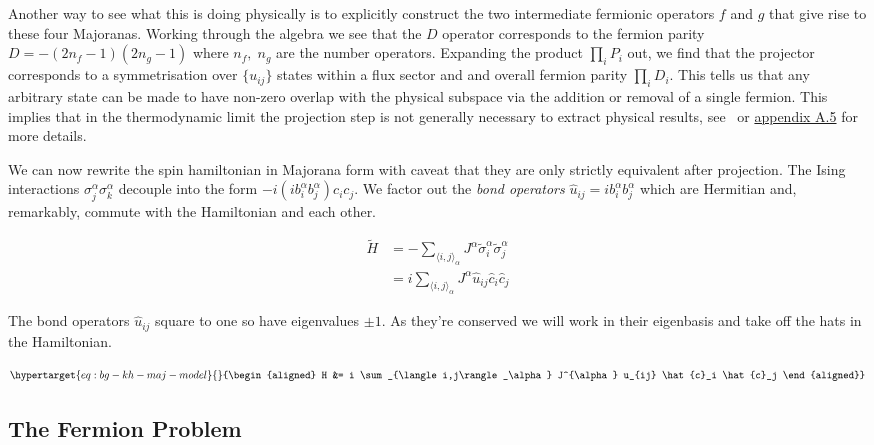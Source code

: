 Another way to see what this is doing physically is to explicitly construct the two intermediate fermionic operators \(f\) and \(g\) that give rise to these four Majoranas. Working through the algebra we see that the \(D\) operator corresponds to the fermion parity \(D = -(2n_f - 1)(2n_g - 1)\) where \(n_f,\; n_g\) are the number operators. Expanding the product \(\prod_i P_i\) out, we find that the projector corresponds to a symmetrisation over \(\{u_{ij}\}\) states within a flux sector and and overall fermion parity \(\prod_i D_i\). This tells us that any arbitrary state can be made to have non-zero overlap with the physical subspace via the addition or removal of a single fermion. This implies that in the thermodynamic limit the projection step is not generally necessary to extract physical results, see~\autocite{pedrocchiPhysicalSolutionsKitaev2011} or \protect\hyperlink{app-the-projector}{appendix A.5} for more details.

We can now rewrite the spin hamiltonian in Majorana form with caveat that they are only strictly equivalent after projection. The Ising interactions \(\sigma_j^{\alpha}\sigma_k^{\alpha}\) decouple into the form \(-i (i b^\alpha_i b^\alpha_j) c_i c_j\). We factor out the \emph{bond operators} \(\hat{u}_{ij} = i b^\alpha_i b^\alpha_j\) which are Hermitian and, remarkably, commute with the Hamiltonian and each other.

\[\begin{aligned}
\tilde{H} &=  - \sum_{\langle i,j\rangle_\alpha} J^{\alpha}\tilde{\sigma}_i^{\alpha}\tilde{\sigma}_j^{\alpha}\\
          &=  i \sum_{\langle i,j\rangle_\alpha} J^{\alpha} \hat{u}_{ij} \hat{c}_i \hat{c}_j
\end{aligned}\]

The bond operators \(\hat{u}_{ij}\) square to one so have eigenvalues \(\pm1\). As they're conserved we will work in their eigenbasis and take off the hats in the Hamiltonian.

\begin{equation}\protect\hypertarget{eq:bg-kh-maj-model}{}{\begin{aligned}
H &=  i \sum_{\langle i,j\rangle_\alpha} J^{\alpha} u_{ij} \hat{c}_i \hat{c}_j
\end{aligned}}\label{eq:bg-kh-maj-model}\end{equation}

\hypertarget{the-fermion-problem}{%
\subsection{The Fermion Problem}\label{the-fermion-problem}}

